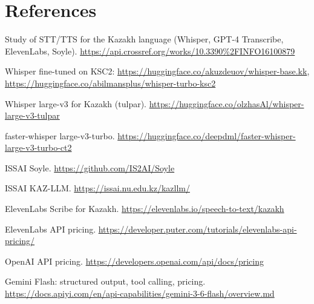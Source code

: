 \documentclass[11pt,a4paper]{article}
\begin{document}
\section{References}

\begin{enumerate}[label={[\arabic*]}, leftmargin=*]
  \item Study of STT/TTS for the Kazakh language (Whisper, GPT-4 Transcribe, ElevenLabs, Soyle). \url{https://api.crossref.org/works/10.3390%2FINFO16100879}
  \item Whisper fine-tuned on KSC2: \url{https://huggingface.co/akuzdeuov/whisper-base.kk}, \url{https://huggingface.co/abilmansplus/whisper-turbo-ksc2}
  \item Whisper large-v3 for Kazakh (tulpar). \url{https://huggingface.co/olzhasAl/whisper-large-v3-tulpar}
  \item faster-whisper large-v3-turbo. \url{https://huggingface.co/deepdml/faster-whisper-large-v3-turbo-ct2}
  \item ISSAI Soyle. \url{https://github.com/IS2AI/Soyle}
  \item ISSAI KAZ-LLM. \url{https://issai.nu.edu.kz/kazllm/}
  \item ElevenLabs Scribe for Kazakh. \url{https://elevenlabs.io/speech-to-text/kazakh}
  \item ElevenLabs API pricing. \url{https://developer.puter.com/tutorials/elevenlabs-api-pricing/}
  \item OpenAI API pricing. \url{https://developers.openai.com/api/docs/pricing}
  \item Gemini Flash: structured output, tool calling, pricing. \url{https://docs.apiyi.com/en/api-capabilities/gemini-3-6-flash/overview.md}
\end{enumerate}
\end{document}
